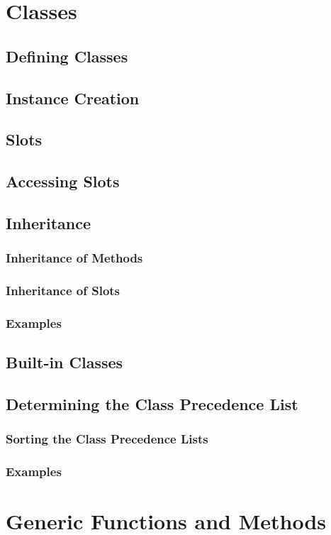 \documentclass[10pt]{book}
\begin{document}
\section{Classes}
\subsection{Defining Classes}
\subsection{Instance Creation}
\subsection{Slots}
\subsection{Accessing Slots}
\subsection{Inheritance}
\subsubsection{Inheritance of Methods}
\subsubsection{Inheritance of Slots}
\subsubsection{Examples}
\subsection{Built-in Classes}
\subsection{Determining the Class Precedence List}
\subsubsection{Sorting the  Class Precedence Lists}
\subsubsection{Examples}
\section{Generic Functions and Methods}
\end{document}
